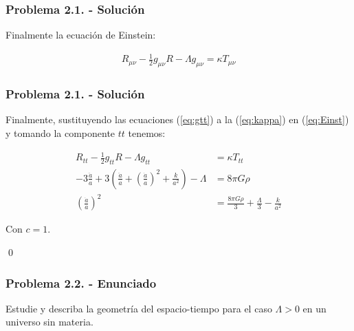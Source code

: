 \begin{frame}
    \frametitle{Problema 2.1. - Solución}

    Finalmente la ecuación de Einstein:

    \begin{align}
        R_{\mu\nu}-\frac{1}{2}g_{\mu\nu}R-\Lambda g_{\mu\nu} = \kappa T_{\mu\nu}
        \label{eq:Einst}
    \end{align}

\end{frame}

\begin{frame}
    \frametitle{Problema 2.1. - Solución}

    Finalmente, sustituyendo las ecuaciones (\ref{eq:gtt})  a la (\ref{eq:kappa}) en (\ref{eq:Einst}) y tomando la componente $tt$ tenemos:

    \begin{align*}
        R_{tt}-\frac{1}{2}g_{tt}R-\Lambda g_{tt} &= \kappa T_{tt}\\
        -3\frac{\ddot{a}}{a}+3\left(\frac{\ddot{a}}{a}+\left(\frac{\dot{a}}{a}\right)^2+\frac{k}{a^2}\right)-\Lambda &= 8\pi G\rho\\
        \left(\frac{\dot{a}}{a}\right)^2 &= \frac{8\pi G\rho}{3} + \frac{\Lambda}{3} - \frac{k}{a^2}
    \end{align*}

    Con $c=1$.

    \qed

\end{frame}

\begin{frame}
    \frametitle{Problema 2.2. - Enunciado}

    Estudie y describa la geometría del espacio-tiempo para el caso $\Lambda > 0$ en un universo sin materia.

\end{frame}

